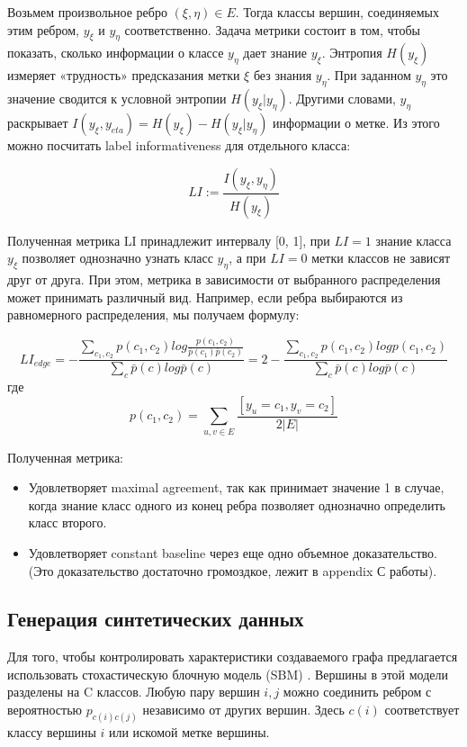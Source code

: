 \documentclass[a4paper,14pt]{article}
\begin{document}
	
	Возьмем произвольное ребро $ (\xi, \eta) \in E $. Тогда классы вершин, соединяемых этим ребром, $y_{\xi}$ и $y_{\eta} $ соответственно.
	Задача метрики состоит в том, чтобы показать, сколько информации о классе $ y_{\eta} $ дает знание $ y_{\xi} $.
	Энтропия $ H(y_{\xi}) $ измеряет «трудность» предсказания метки $ \xi $ без знания $ y_{\eta} $.
	При заданном $ y_{\eta} $ это значение сводится к условной энтропии $ H(y_{\xi}|y_{\eta}) $.
	Другими словами, $ y_{\eta} $ раскрывает $ I(y_{\xi},y_{eta}) = H(y_{\xi}) − H(y_{\xi}|y_{\eta}) $ информации о метке.
	Из этого можно посчитать label informativeness для отдельного класса:
	
	$$ LI := \frac{I( y_{\xi}, y_{\eta} )}{H(y_{\xi})} $$
	
	Полученная метрика LI принадлежит интервалу [0, 1], при $ LI = 1 $ знание класса $ y_{\xi} $ позволяет однозначно узнать класс $ y_{\eta} $, а при $ LI = 0 $ метки классов не зависят друг от друга.
	При этом, метрика в зависимости от выбранного распределения может принимать различный вид. Например, если ребра выбираются из равномерного распределения, мы получаем формулу:
	
	$$ LI_{edge} = - \frac{ \sum_{c_1, c_2} p(c_1, c_2) log \frac{ p(c_1, c_2) }{ \bar{p}(c_1) \bar{p}(c_2) } }{ \sum_c \bar{p}(c) log \bar{p}(c) } = 2 - \frac{  \sum_{c_1, c_2} p(c_1, c_2)  log p(c_1, c_2) }{ \sum_c \bar{p}(c) log \bar{p}(c) } $$
	где $$ p(c_1, c_2) = \sum_{u, v \in E} \frac{ [y_u = c_1, y_v = c_2] }{ 2|E| } $$
	
	Полученная метрика:
	\begin{itemize}
		\item Удовлетворяет maximal agreement, так как принимает значение 1 в случае, когда знание класс одного из конец ребра позволяет однозначно определить класс второго.
		
		\item Удовлетворяет constant baseline через еще одно объемное доказательство. (Это доказательство достаточно громоздкое, лежит в appendix С работы).
	\end{itemize}
	
	\subsection{Генерация синтетических данных}
	
	Для того, чтобы контролировать характеристики создаваемого графа предлагается использовать стохастическую блочную модель (SBM) \cite{holland1983stochastic}.
	Вершины в этой модели разделены на C классов.
	Любую пару вершин $i,j$ можно соединить ребром с вероятностью $p_{c(i)c(j)}$  независимо от других вершин.
	Здесь $c(i)$ соответствует классу вершины $i$ или искомой метке вершины.
	
\end{document}
